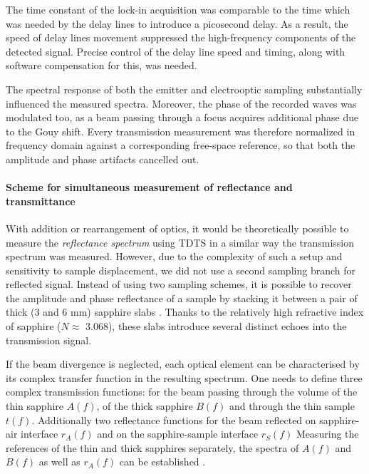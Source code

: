 The time constant of the lock-in acquisition was comparable to the time which was needed by the delay lines to introduce a picosecond delay. As a result, the speed of delay lines movement suppressed the high-frequency components of the detected signal. Precise control of the delay line speed and timing, along with software compensation for this, was needed.

The spectral response of both the emitter and electrooptic sampling substantially influenced the measured spectra. Moreover, the phase of the recorded waves was modulated too, as a beam passing through a focus acquires additional phase due to the Gouy shift. Every transmission measurement was therefore normalized in frequency domain against a corresponding free-space reference, so that both the amplitude and phase artifacts cancelled out. 
\paragraph{Scheme for simultaneous measurement of reflectance and transmittance}%
With addition or rearrangement of optics, it would be theoretically possible to measure the \textit{reflectance spectrum} using TDTS in a similar way the transmission spectrum was measured. However, due to the complexity of such a setup and sensitivity to sample displacement, we did not use a second sampling branch for reflected signal. Instead of using two sampling schemes, it is possible to recover the amplitude and phase reflectance of a sample by stacking it between a pair of thick (3 and 6 mm) sapphire slabs \cite{nemec2012resonant}. Thanks to the relatively high refractive index of sapphire ($N \approx$ 3.068), these slabs introduce several distinct  echoes into the transmission signal.

If the beam divergence is neglected, each optical element can be characterised by its complex transfer function in the resulting spectrum. One needs to define three complex transmission functions: for the beam passing through the volume of the thin sapphire $A(f)$, of the thick sapphire $B(f)$ and through the thin sample $t(f)$. Additionally two reflectance functions for the beam reflected on sapphire-air interface $r_{A}(f)$ and on the sapphire-sample interface $r_S(f)$
Measuring the references of the thin and thick sapphires separately, the spectra of $A(f)$ and $B(f)$ as well as $r_{A}(f)$ can be established \cite{nemec2012resonant}. 

